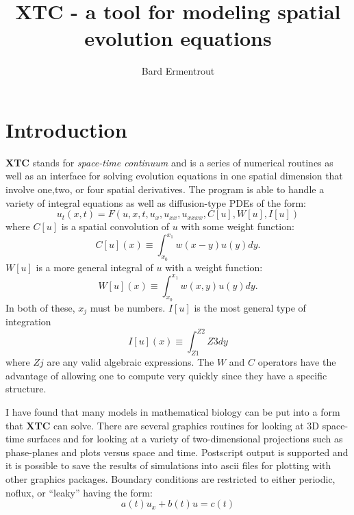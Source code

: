 \newcommand{\beq}{\begin{equation}}
\newcommand{\eeq}{\end{equation}}
\newcommand{\beqa}{\begin{eqnarray}}
\newcommand{\eeqa}{\end{eqnarray}}
\newcommand{\beqann}{\begin{eqnarray*}}
\newcommand{\eeqann}{\end{eqnarray*}}
\newcommand{\nn}{\mbox{${\nonumber}$}}
\newcommand{\labeq}[1]{\label{eq:#1}}
\newcommand{\refeq}[1]{(\ref{eq:#1})}
\newcommand{\xtc}{{\bf XTC \/}}

\title{XTC - a tool for modeling spatial evolution equations}
\author{Bard Ermentrout}

\maketitle


\section{Introduction} \xtc stands for {\it space-time continuum} and
is a series of numerical routines as well as an interface for solving
evolution equations in one spatial dimension that involve one,two, or
four spatial derivatives.
  The program is able to handle a variety of
integral equations as well as diffusion-type PDEs of the form:
\[
 u_t(x,t) = F(u,x,t,u_x,u_{xx},u_{xxxx},C[u],W[u],I[u])
\]
where $C[u]$ is a spatial convolution of $u$ with some weight
function:
\beq
C[u](x) \equiv \int_{x_0}^{x_1} w(x-y)u(y) dy.
\eeq
$W[u]$ is a more general integral of $u$ with a weight
function:
\beq
W[u](x) \equiv \int_{x_0}^{x_1} w(x,y)u(y) dy.
\eeq
In both of these, $x_j$ must be numbers.
$I[u]$ is the most general type of integration
\beq
I[u](x) \equiv \int_{Z1}^{Z2}{Z3} dy
\eeq
where $Zj$ are any valid algebraic expressions.  The $W$
and $C$ operators have the advantage of allowing one to compute very
quickly since they have a specific structure.  

I have found that
many models in mathematical biology can be put into a form that \xtc
can solve.  There are several graphics routines for looking at 3D
space-time surfaces and for looking at a variety of two-dimensional
projections such as phase-planes and plots versus space and time.
Postscript output is supported and it is possible to save the results
of simulations into ascii files for plotting with other graphics
packages. 
Boundary conditions are restricted to either periodic, noflux, or
``leaky'' having the form:
\beq 
 a(t)u_x+b(t)u=c(t)
\eeq

